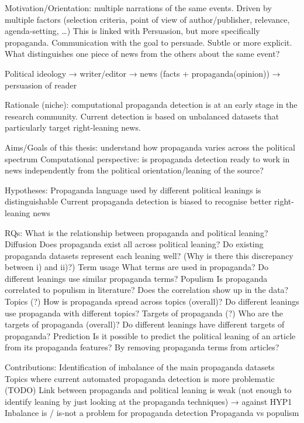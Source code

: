 Motivation/Orientation: multiple narrations of the same events. Driven by multiple factors (selection criteria, point of view of author/publisher, relevance, agenda-setting, …)
This is linked with Persuasion, but more specifically propaganda. Communication with the goal to persuade. Subtle or more explicit.
What distinguishes one piece of news from the others about the same event? 

Political ideology → writer/editor → news (facts + propaganda(opinion)) → persuasion of reader

Rationale (niche): computational propaganda detection is at an early stage in the research community. Current detection is based on unbalanced datasets that particularly target right-leaning news.

Aims/Goals of this thesis: 
understand how propaganda varies across the political spectrum
Computational perspective: is propaganda detection ready to work in news independently from the political orientation/leaning of the source?

Hypotheses:
Propaganda language used by different political leanings is distinguishable
 Current propaganda detection is biased to recognise better right-leaning news



RQs:
What is the relationship between propaganda and political leaning?
Diffusion
Does propaganda exist all across political leaning?
Do existing propaganda datasets represent each leaning well?
(Why is there this discrepancy between i) and ii)?)
Term usage
What terms are used in propaganda?
Do different leanings use similar propaganda terms?
Populism
Is propaganda correlated to populism in literature?
Does the correlation show up in the data?
Topics (?)
How is propaganda spread across topics (overall)?
Do different leanings use propaganda with different topics?
Targets of propaganda (?)
Who are the targets of propaganda (overall)?
Do different leanings have different targets of propaganda?
Prediction
Is it possible to predict the political leaning of an article from its propaganda features?
By removing propaganda terms from articles? 

Contributions:
Identification of imbalance of the main propaganda datasets
Topics where current automated propaganda detection is more problematic (TODO) 
Link between propaganda and political leaning is weak (not enough to identify leaning by just looking at the propaganda techniques) → against HYP1
Inbalance is / is-not a problem for propaganda detection
Propaganda vs populism
